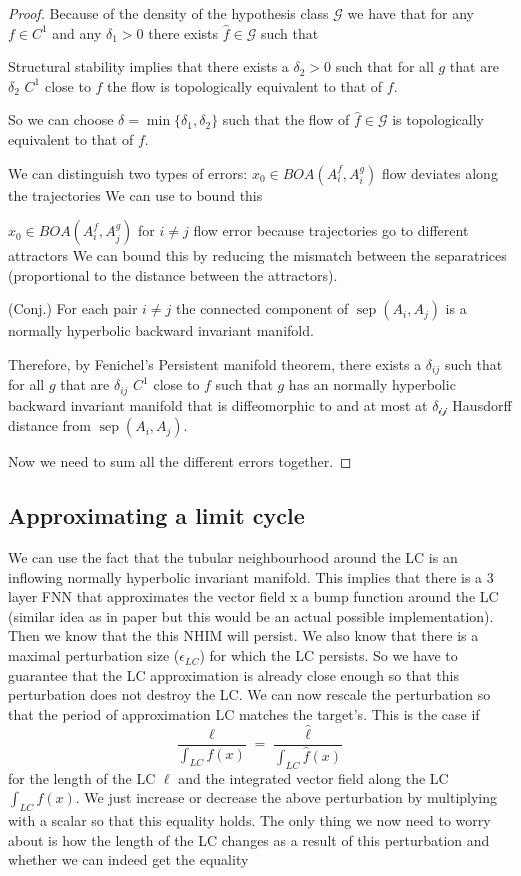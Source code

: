 \documentclass{article}
\theoremstyle{definition}
\theoremstyle{remark}
\newcommand{\sep}{\operatorname{sep}}
\begin{document}
\begin{proof}
Because of the density of the hypothesis class $\mathcal{G}$ we have that for any $f\in C^1$ and any $\delta_1>0$
there exists $\hat f\in\mathcal{G}$ such that 


Structural stability implies that there exists a $\delta_2>0$ such that for all $g$ that are $\delta_2$ $C^1$ close to $f$ the flow is topologically equivalent to that of $f$.

So we can choose $\delta = \min\{\delta_1,\delta_2\}$ such that the flow of $\hat f\in\mathcal{G}$ is topologically equivalent to that of $f$.



We can distinguish two types of errors:
$x_0\in BOA(A_i^f,A_i^g)$ flow deviates along the trajectories
We can use \citep{vanhandel2007filtering} to bound this


$x_0\in BOA(A_i^f,A_j^g)$ for $i\neq j$
flow error because trajectories go to different attractors
We can bound this by reducing the mismatch between the separatrices (proportional to the distance between the attractors).

(Conj.) For each pair $i\neq j$ the connected component of $\sep(A_i,A_j)$ is a normally hyperbolic backward invariant manifold.

Therefore, by Fenichel's Persistent manifold theorem, there exists a $\delta_{ij}$ such that for all $g$ that are $\delta_{ij}$ $C^1$ close to $f$ such that $g$ has an  normally hyperbolic backward invariant manifold that is diffeomorphic to and at most at $\mathcal{\delta_{ij}}$ Hausdorff distance from $\sep(A_i,A_j)$.


Now we need to sum all the different errors together.
\end{proof}



\subsection{Approximating a limit cycle}


We can use the fact that the tubular neighbourhood around the LC is an inflowing normally hyperbolic invariant manifold.
This implies that there is a 3 layer FNN that approximates the vector field x a bump function around the LC (similar idea as in paper but this would be an actual possible implementation).
Then we know that the this NHIM will persist.
We also know that there is a maximal perturbation size ($\epsilon_{LC}$) for which the LC persists.
So we have to guarantee that the LC approximation is already close enough so that this perturbation does not destroy the LC.
We can now rescale the perturbation so that the period of approximation LC matches the target's. This is the case if 
\[\frac{\ell}{\int_{LC}f(x)} =  \frac{\hat \ell}{\int_{LC}\hat f(x)}\] for the length of the LC $\ell$ and the integrated vector field along the LC $\int_{LC}f(x)$.
We just increase or decrease  the above perturbation by multiplying with a scalar so that this equality holds.
The only thing we now need to worry about is how the length of the LC changes as a result of this perturbation and whether we can indeed get the equality 
\end{document}
